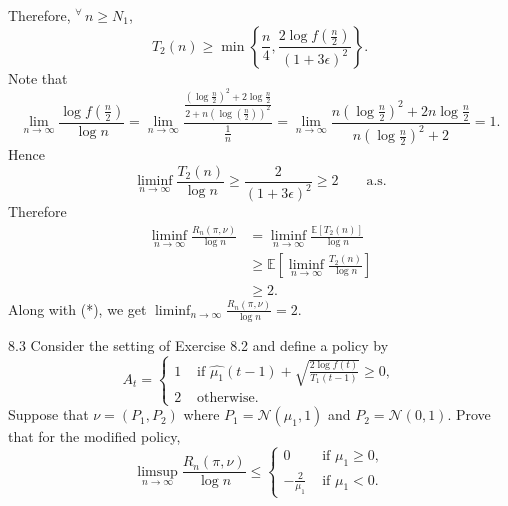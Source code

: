 \documentclass[10pt]{article}
\theoremstyle{definition}
\newenvironment{exercise*}[1]{%
  \IfBlankTF{#1}
    {\renewcommand{\themanualexerciseinner}{\unskip}}
    {\renewcommand\themanualexerciseinner{#1}}%
  \manualexerciseinner
}{\endmanualexerciseinner}
\newenvironment{solution*}[1]{%
  \IfBlankTF{#1}
    {\renewcommand{\themanualsolutioninner}{\unskip}}
    {\renewcommand\themanualsolutioninner{#1}}%
  \manualsolutioninner
}{\endmanualsolutioninner}
\begin{document}
\begin{solution*}{}
\begin{equation*}
    \end{equation*}
    Therefore, $^\forall \, n \geq N_1$,
    \begin{equation*}
        T_2(n) \geq \min \left\{ \frac{n}{4}, \frac{2\log f(\frac{n}{2})}{(1+3\epsilon)^2} \right\}.
    \end{equation*}
    Note that
    \begin{equation*}
        \lim_{n \to \infty} \frac{\log f(\frac{n}{2})}{\log n} 
        = \lim_{n \to \infty} \frac{\frac{(\log \frac{n}{2})^2 + 2 \log \frac{n}{2}}{2 + n \left( \log \left( \frac{n}{2} \right) \right)^2}}{{\frac{1}{n}}}
        = \lim_{n \to \infty} \frac{n \left( \log \frac{n}{2}\right)^2 + 2n\log \frac{n}{2}}{n\left(\log \frac{n}{2}\right)^2 + 2}
        = 1.
    \end{equation*}
    Hence
    \begin{equation*}
        \liminf_{n \to \infty} \frac{T_2(n)}{\log n} \geq \frac{2}{(1+3\epsilon)^2} \geq 2 \qquad \text{a.s.}
    \end{equation*}
    Therefore
    \begin{align*}
        \liminf_{n \to \infty} \frac{R_n (\pi, \nu)}{\log n} &= \liminf_{n \to \infty} \frac{\mathbb{E}\left[T_2(n)\right]}{\log n} \\
        &\geq \mathbb{E} \left[ \liminf_{n \to \infty} \frac{T_2(n)}{\log n}\right] \\
        &\geq 2.
    \end{align*}
    Along with (*), we get $\liminf_{n \to \infty} \frac{R_n (\pi, \nu)}{\log n} = 2$.
\end{solution*}

\begin{exercise*}{8.3}
    Consider the setting of Exercise 8.2 and define a policy by
    \begin{equation*}
        A_t = \begin{cases}
            1 & \text{ if } \hat{\mu_1}(t-1) + \sqrt{\frac{2 \log f(t)}{T_1(t-1)}} \geq 0,\\
            2 & \text{ otherwise.}
        \end{cases}
    \end{equation*}
    Suppose that $\nu = (P_1, P_2)$ where $P_1 = \mathcal{N}(\mu_1 , 1)$ and $P_2 = \mathcal{N}(0,1)$.
    Prove that for the modified policy,
    \begin{equation*}
        \limsup_{n \to \infty} \frac{R_n(\pi, \nu)}{\log n} \leq 
        \begin{cases}
            0 & \text{ if } \mu_1 \geq 0,\\
            -\frac{2}{\mu_1} & \text{ if } \mu_1 < 0.
        \end{cases}
    \end{equation*}
\end{exercise*}
\end{document}
